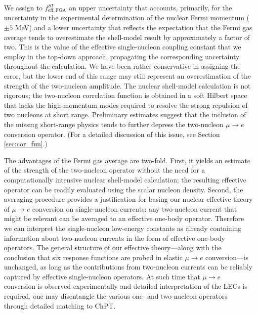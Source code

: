 \documentclass[12pt,letterpaper]{book}
\begin{document}
We assign to $f^{SI}_\mathrm{eff,FGA}$ an upper uncertainty that accounts, primarily, for the uncertainty in the experimental determination of the nuclear Fermi momentum ($\pm 5$ MeV) and a lower uncertainty that reflects the expectation that the Fermi gas average tends to overestimate the shell-model result by approximately a factor of two. This is the value of the effective single-nucleon coupling constant that we employ in the top-down approach, propagating the corresponding uncertainty throughout the calculation. We have been rather conservative in assigning the error, but the lower end of this range may still represent an overestimation of the strength of the two-nucleon amplitude. The nuclear shell-model calculation is not rigorous; the two-nucleon correlation function is obtained in a soft Hilbert space that lacks the high-momentum modes required to resolve the strong repulsion of two nucleons at short range. Preliminary estimates suggest that the inclusion of the missing short-range physics tends to further depress the two-nucleon $\mu\rightarrow e$ conversion operator. (For a detailed discussion of this issue, see Section \ref{sec:cor_fun}.)

The advantages of the Fermi gas average are two-fold. First, it yields an estimate of the strength of the two-nucleon operator without the need for a computationally intensive nuclear shell-model calculation; the resulting effective operator can be readily evaluated using the scalar nucleon density. Second, the averaging procedure provides a justification for basing our nuclear effective theory of $\mu\rightarrow e$ conversion on single-nucleon currents: any two-nucleon current that might be relevant can be averaged to an effective one-body operator. Therefore we can interpret the single-nucleon low-energy constants as already containing information about two-nucleon currents in the form of effective one-body operators. The general structure of our effective theory---along with the conclusion that six response functions are probed in elastic $\mu\rightarrow e$ conversion---is unchanged, as long as the contributions from two-nucleon currents can be reliably captured by effective single-nucleon operators. At such time that $\mu\rightarrow e$ conversion is observed experimentally and detailed interpretation of the LECs is required, one may disentangle the various one- and two-nucleon operators through detailed matching to ChPT.
\end{document}
